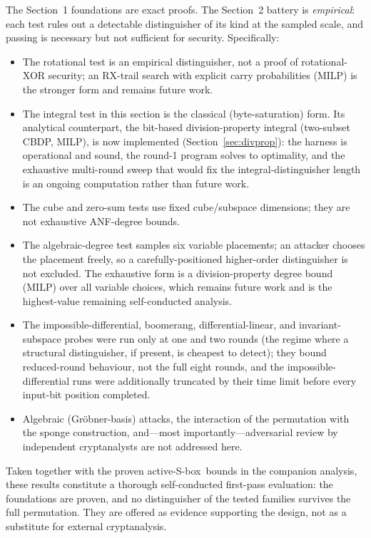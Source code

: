 \documentclass[11pt]{article}
\newcommand{\sbx}{S\nobreakdash-box}
\begin{document}
The Section~1 foundations are exact proofs. The Section~2 battery is
\emph{empirical}: each test rules out a detectable distinguisher of its kind at
the sampled scale, and passing is necessary but not sufficient for security.
Specifically:
\begin{itemize}\itemsep2pt
  \item The rotational test is an empirical distinguisher, not a proof of
        rotational-XOR security; an RX-trail search with explicit carry
        probabilities (MILP) is the stronger form and remains future work.
  \item The integral test in this section is the classical (byte-saturation)
        form. Its analytical counterpart, the bit-based division-property integral
        (two-subset CBDP, MILP), is now implemented (Section~\ref{sec:divprop}): the harness is
        operational and sound, the round-1 program solves to optimality, and the
        exhaustive multi-round sweep that would fix the integral-distinguisher
        length is an ongoing computation rather than future work.
  \item The cube and zero-sum tests use fixed cube/subspace dimensions; they are
        not exhaustive ANF-degree bounds.
  \item The algebraic-degree test samples six variable placements; an attacker
        chooses the placement freely, so a carefully-positioned higher-order
        distinguisher is not excluded. The exhaustive form is a division-property
        degree bound (MILP) over all variable choices, which remains future work
        and is the highest-value remaining self-conducted analysis.
  \item The impossible-differential, boomerang, differential-linear, and
        invariant-subspace probes were run only at one and two rounds (the
        regime where a structural distinguisher, if present, is cheapest to
        detect); they bound reduced-round behaviour, not the full eight rounds,
        and the impossible-differential runs were additionally truncated by
        their time limit before every input-bit position completed.
  \item Algebraic (Gr\"obner-basis) attacks, the interaction of the permutation
        with the sponge construction, and---most importantly---adversarial
        review by independent cryptanalysts are not addressed here.
\end{itemize}
Taken together with the proven active-\sbx\ bounds in the companion analysis,
these results constitute a thorough self-conducted first-pass evaluation: the
foundations are proven, and no distinguisher of the tested families survives the
full permutation. They are offered as evidence supporting the design, not as a
substitute for external cryptanalysis.
\end{document}
